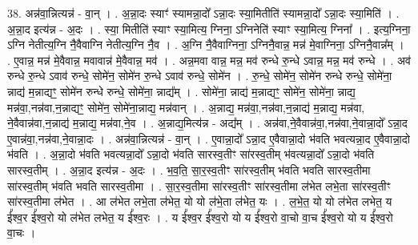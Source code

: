 \documentclass[17pt]{extarticle}
\begin{document}
38. अन्न॑वा॒न्नित्यन्न॑ - वा॒न् । . अ॒न्ना॒दः स्याꣳ॑ स्यामन्ना॒दो᳚ ऽन्ना॒दः स्या॒मितीति॑ स्यामन्ना॒दो᳚ ऽन्ना॒दः स्या॒मिति॑ । . अ॒न्ना॒द इत्य॑न्न - अ॒दः । . स्या॒ मितीति॑ स्याꣳ स्या॒मित्य॒ ग्निना॒ ऽग्निनेति॑ स्याꣳ स्या॒मित्य॒ ग्निना᳚ । . इत्य॒ग्निना॒ ऽग्नि नेतीत्य॒ग्नि नै॒वैवाग्नि नेतीत्य॒ग्नि नै॒व । . अ॒ग्नि नै॒वैवाग्निना॒ ऽग्निनै॒वान्न॒ मन्न॑ मे॒वाग्निना॒ ऽग्निनै॒वान्न᳚म् । . ए॒वान्न॒ मन्न॑ मे॒वैवान्न॒ मवावान्न॑ मे॒वैवान्न॒ मव॑ । . अन्न॒मवा वान्न॒ मन्न॒ मव॑ रुन्धे रु॒न्धे ऽवान्न॒ मन्न॒ मव॑ रुन्धे । . अव॑ रुन्धे रु॒न्धे ऽवाव॑ रुन्धे॒ सोमे॑न॒ सोमे॑न रु॒न्धे ऽवाव॑ रुन्धे॒ सोमे॑न । . रु॒न्धे॒ सोमे॑न॒ सोमे॑न रुन्धे रुन्धे॒ सोमे॑ना॒ न्नाद्य॑ म॒न्नाद्यꣳ॒॒ सोमे॑न रुन्धे रुन्धे॒ सोमे॑ना॒ न्नाद्य᳚म् । . सोमे॑ना॒ न्नाद्य॑ म॒न्नाद्यꣳ॒॒ सोमे॑न॒ सोमे॑ना॒ न्नाद्य॒ मन्न॑वा॒,नन्न॑वा,न॒न्नाद्यꣳ॒॒ सोमे॑न॒ सोमे॑ना॒न्नाद्य॒ मन्न॑वान् । . अ॒न्नाद्य॒ मन्न॑वा॒,नन्न॑वा,न॒न्नाद्य॑ म॒न्नाद्य॒ मन्न॑वा, ने॒वैवान्न॑वा,न॒न्नाद्य॑ म॒न्नाद्य॒ मन्न॑वा,ने॒व । . अ॒न्नाद्य॒मित्य॑न्न - अद्य᳚म् । . अन्न॑वा,ने॒वैवान्न॑वा॒,नन्न॑वा,ने॒वान्ना॒दो᳚ ऽन्ना॒द ए॒वान्न॑वा॒,नन्न॑वा,ने॒वान्ना॒दः । . अन्न॑वा॒न्नित्यन्न॑ - वा॒न् । . ए॒वान्ना॒दो᳚ ऽन्ना॒द ए॒वैवान्ना॒दो भ॑वति भवत्यन्ना॒द ए॒वैवान्ना॒दो भ॑वति । . अ॒न्ना॒दो भ॑वति भवत्यन्ना॒दो᳚ ऽन्ना॒दो भ॑वति सारस्व॒तीꣳ सा॑रस्व॒तीम् भ॑वत्यन्ना॒दो᳚ ऽन्ना॒दो भ॑वति सारस्व॒तीम् । . अ॒न्ना॒द इत्य॑न्न - अ॒दः । . भ॒व॒ति॒ सा॒र॒स्व॒तीꣳ सा॑रस्व॒तीम् भ॑वति भवति सारस्व॒तीमा सा॑रस्व॒तीम् भ॑वति भवति सारस्व॒तीमा । . सा॒र॒स्व॒तीमा सा॑रस्व॒तीꣳ सा॑रस्व॒तीमा ल॑भेत लभे॒ता सा॑रस्व॒तीꣳ सा॑रस्व॒तीमा ल॑भेत । . आ ल॑भेत लभे॒ता ल॑भेत॒ यो यो ल॑भे॒ता ल॑भेत॒ यः । . ल॒भे॒त॒ यो यो ल॑भेत लभेत॒ य ई᳚श्व॒र ई᳚श्व॒रो यो ल॑भेत लभेत॒ य ई᳚श्व॒रः । . य ई᳚श्व॒र ई᳚श्व॒रो यो य ई᳚श्व॒रो वा॒चो वा॒च ई᳚श्व॒रो यो य ई᳚श्व॒रो वा॒चः । \newline
\pagebreak
{}
\end{document}

